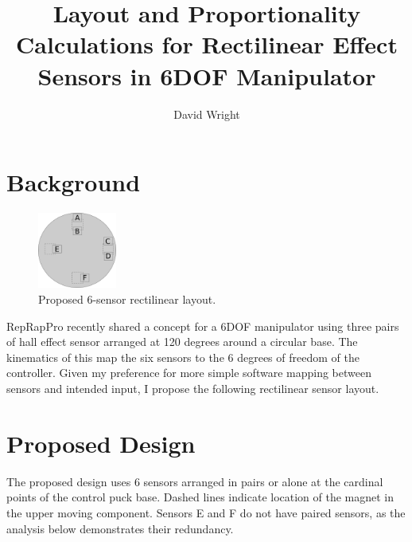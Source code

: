 \documentclass[]{article}
\title{Layout and Proportionality Calculations for Rectilinear Effect Sensors in 6DOF Manipulator}
\author{David Wright}
\begin{document}
	
	\maketitle
	
	
	
	\section{Background}

\begin{figure}
	\begin{center}
		\includegraphics[width=0.23\textwidth]{layout.png}
	\end{center}
	\caption{Proposed 6-sensor rectilinear layout.}
	\label{fig:ProposedLayout}
	
\end{figure}
	RepRapPro recently shared a concept for a 6DOF manipulator using three pairs of hall effect sensor arranged at 120 degrees around a circular base. The kinematics of this map the six sensors to the 6 degrees of freedom of the controller. Given my preference for more simple software mapping between sensors and intended input, I propose the following rectilinear sensor layout.

	\section{Proposed Design}
	
	The proposed design uses 6 sensors arranged in pairs or alone at the cardinal points of the control puck base. Dashed lines indicate location of the magnet in the upper moving component. Sensors E and F do not have paired sensors, as the analysis below demonstrates their redundancy. 
	
\end{document}
